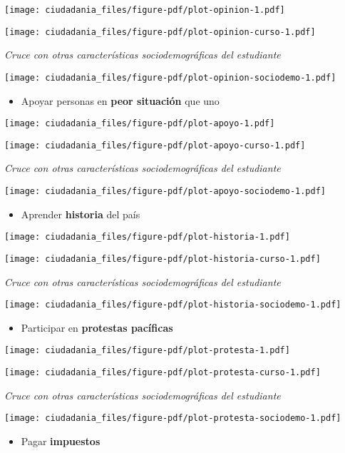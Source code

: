 \documentclass[
  letterpaper,
  DIV=11,
  numbers=noendperiod]{scrreprt}
\providecommand{\tightlist}{%
  \setlength{\itemsep}{0pt}\setlength{\parskip}{0pt}}\usepackage{longtable,booktabs,array}
\begin{document}
\texttt{[image: ciudadania\_files/figure-pdf/plot-opinion-1.pdf]}

\texttt{[image: ciudadania\_files/figure-pdf/plot-opinion-curso-1.pdf]}

\emph{Cruce con otras características sociodemográficas del estudiante}

\texttt{[image: ciudadania\_files/figure-pdf/plot-opinion-sociodemo-1.pdf]}

\begin{itemize}
\tightlist
\item
  Apoyar personas en \textbf{peor situación} que uno
\end{itemize}

\texttt{[image: ciudadania\_files/figure-pdf/plot-apoyo-1.pdf]}

\texttt{[image: ciudadania\_files/figure-pdf/plot-apoyo-curso-1.pdf]}

\emph{Cruce con otras características sociodemográficas del estudiante}

\texttt{[image: ciudadania\_files/figure-pdf/plot-apoyo-sociodemo-1.pdf]}

\begin{itemize}
\tightlist
\item
  Aprender \textbf{historia} del país
\end{itemize}

\texttt{[image: ciudadania\_files/figure-pdf/plot-historia-1.pdf]}

\texttt{[image: ciudadania\_files/figure-pdf/plot-historia-curso-1.pdf]}

\emph{Cruce con otras características sociodemográficas del estudiante}

\texttt{[image: ciudadania\_files/figure-pdf/plot-historia-sociodemo-1.pdf]}

\begin{itemize}
\tightlist
\item
  Participar en \textbf{protestas pacíficas}
\end{itemize}

\texttt{[image: ciudadania\_files/figure-pdf/plot-protesta-1.pdf]}

\texttt{[image: ciudadania\_files/figure-pdf/plot-protesta-curso-1.pdf]}

\emph{Cruce con otras características sociodemográficas del estudiante}

\texttt{[image: ciudadania\_files/figure-pdf/plot-protesta-sociodemo-1.pdf]}

\begin{itemize}
\tightlist
\item
  Pagar \textbf{impuestos}
\end{itemize}
\end{document}
